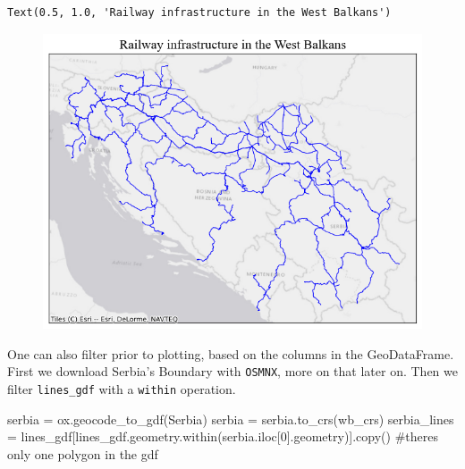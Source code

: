 \documentclass[
  letterpaper,
  DIV=11,
  numbers=noendperiod]{scrreprt}
\newenvironment{Shaded}{\begin{snugshade}}{\end{snugshade}}
\newcommand{\CommentTok}[1]{\textcolor[rgb]{0.37,0.37,0.37}{#1}}
\newcommand{\DecValTok}[1]{\textcolor[rgb]{0.68,0.00,0.00}{#1}}
\newcommand{\NormalTok}[1]{\textcolor[rgb]{0.00,0.23,0.31}{#1}}
\newcommand{\OperatorTok}[1]{\textcolor[rgb]{0.37,0.37,0.37}{#1}}
\newcommand{\StringTok}[1]{\textcolor[rgb]{0.13,0.47,0.30}{#1}}
\begin{document}
\begin{verbatim}
Text(0.5, 1.0, 'Railway infrastructure in the West Balkans')
\end{verbatim}

\begin{figure}[H]

{\centering \includegraphics{labs/w02_maps_files/figure-pdf/cell-11-output-2.png}

}

\end{figure}

One can also filter prior to plotting, based on the columns in the
GeoDataFrame. First we download Serbia's Boundary with \texttt{OSMNX},
more on that later on. Then we filter \texttt{lines\_gdf} with a
\texttt{within} operation.

\begin{Shaded}
\begin{Highlighting}[]
\NormalTok{serbia }\OperatorTok{=}\NormalTok{ ox.geocode\_to\_gdf(}\StringTok{\textquotesingle{}Serbia\textquotesingle{}}\NormalTok{)}
\NormalTok{serbia }\OperatorTok{=}\NormalTok{ serbia.to\_crs(wb\_crs)}
\NormalTok{serbia\_lines }\OperatorTok{=}\NormalTok{ lines\_gdf[lines\_gdf.geometry.within(serbia.iloc[}\DecValTok{0}\NormalTok{].geometry)].copy() }\CommentTok{\#there\textquotesingle{}s only one polygon in the gdf}
\end{Highlighting}
\end{Shaded}
\end{document}
